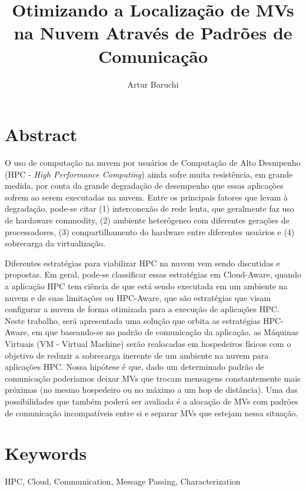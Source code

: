 \documentclass[11pt, titlepage]{article}
\begin{document}
\title{Otimizando a Localização de MVs na Nuvem Através de Padrões de Comunicação}\author{Artur Baruchi}
\maketitle
\section{Abstract}
\label{MPSection:916E337A-8E01-4963-AF49-BE8C7DC6C2A9}

O uso de computação na nuvem por usuários de Computação de Alto Desmpenho (HPC -
      \emph{High Performance Computing}) ainda sofre muita resistência, em grande medida, por conta da grande degradação de desempenho que essas aplicações sofrem ao serem executadas na nuvem. Entre os principais fatores que levam à degradação, pode-se citar (1) interconexão de rede lenta, que geralmente faz uso de hardaware commodity, (2) ambiente heterôgeneo com diferentes gerações de processadores, (3) compartilhamento do hardware entre diferentes usuários e (4) sobrecarga da virtualização.

Diferentes estratégias para viabilizar HPC na nuvem vem sendo discutidas e propostas. Em geral, pode-se classificar essas estratégias em Cloud-Aware, quando a aplicação HPC tem ciência de que está sendo executada em um ambiente na nuvem e de suas limitações ou HPC-Aware, que são estratégias que visam configurar a nuvem de forma otimizada para a execução de aplicações HPC. Neste trabalho, será apresentada uma solução que orbita as estratégias HPC-Aware, em que baseando-se no padrão de comunicação da aplicação, as Máquinas Virtuais (VM - Virtual Machine) serão realocadas em hospedeiros físicos com o objetivo de reduzir a sobrecarga inerente de um ambiente na nuvem para aplicações HPC. Nossa hipótese é que, dado um determinado padrão de comunicação poderiamos deixar MVs que trocam mensagens constantemente mais próximas (no mesmo hospedeiro ou no máximo a um hop de distância). Uma das possibilidades que também poderá ser avaliada é a alocação de MVs com padrões de comunicação incompatíveis entre si e separar MVs que estejam nessa situação.

\section{Keywords}
\label{MPSection:3D7588EF-0A74-4F02-AD69-655B1031BE95}

HPC, Cloud, Communication, Message Passing, Characterization
\end{document}
